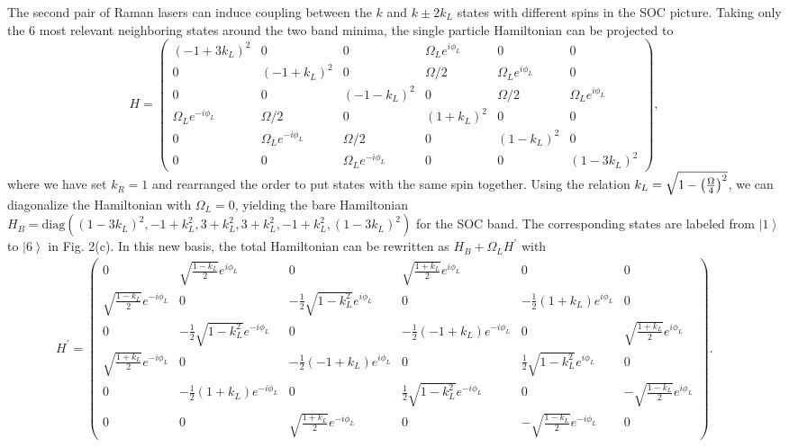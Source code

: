 \documentclass[twocolumn,prl,floatfix,citeautoscript,nofootinbib,superscriptaddress]{revtex4}
\begin{document}
The second pair of Raman lasers can induce coupling between the $k$ and $%
k\pm 2k_{L} $ states with different spins in the SOC picture. Taking only
the $6$ most relevant neighboring states around the two band minima, the
single particle Hamiltonian can be projected to
\begin{equation*}
H=\left(
\begin{array}{cccccc}
(-1+3k_{L})^{2} & 0 & 0 & \Omega _{L}e^{i\phi _{L}} & 0 & 0 \\
0 & (-1+k_{L})^{2} & 0 & \Omega /2 & \Omega _{L}e^{i\phi _{L}} & 0 \\
0 & 0 & (-1-k_{L})^{2} & 0 & \Omega /2 & \Omega _{L}e^{i\phi _{L}} \\
\Omega _{L}e^{-i\phi _{L}} & \Omega /2 & 0 & (1+k_{L})^{2} & 0 & 0 \\
0 & \Omega _{L}e^{-i\phi _{L}} & \Omega /2 & 0 & (1-k_{L})^{2} & 0 \\
0 & 0 & \Omega _{L}e^{-i\phi _{L}} & 0 & 0 & (1-3k_{L})^{2}%
\end{array}%
\right) ,
\end{equation*}%
where we have set $k_{R}=1$ and rearranged the order to put states with the
same spin together. Using the relation ${k_{L}}=\sqrt{1-{{\left( {\frac{%
\Omega }{4}}\right) }^{2}}}$, we can diagonalize the Hamiltonian with $%
\Omega _{L}=0$, yielding the bare Hamiltonian $H_{B}=\text{diag}\left(
(1-3k_{L})^{2},-1+k_{L}^{2},3+k_{L}^{2},3+k_{L}^{2},-1+k_{L}^{2},(1-3k_{L})^{2}\right)
$ for the SOC band. The corresponding states are labeled from $\left\vert
1\right\rangle $ to $\left\vert 6\right\rangle $ in Fig. 2(c). In this new
basis, the total Hamiltonian can be rewritten as $H_{B}+\Omega _{L}H^{\prime
}$ with
\begin{eqnarray*}
H^{\prime }= \left(
\begin{array}{cccccc}
0 & \sqrt{\frac{1-k_{L}}{2}}e^{i\phi _{L}} & 0 & \sqrt{\frac{1+k_{L}}{2}}%
e^{i\phi _{L}} & 0 & 0 \\
\sqrt{\frac{1-k_{L}}{2}}e^{-i\phi _{L}} & 0 & -\frac{1}{2}\sqrt{1-k_{L}^{2}}%
e^{i\phi _{L}} & 0 & -\frac{1}{2}(1+k_{L})e^{i\phi _{L}} & 0 \\
0 & -\frac{1}{2}\sqrt{1-k_{L}^{2}}e^{-i\phi _{L}} & 0 & -\frac{1}{2}%
(-1+k_{L})e^{-i\phi _{L}} & 0 & \sqrt{\frac{1+k_{L}}{2}}e^{i\phi _{L}} \\
\sqrt{\frac{1+k_{L}}{2}}e^{-i\phi _{L}} & 0 & -\frac{1}{2}(-1+k_{L})e^{i\phi
_{L}} & 0 & \frac{1}{2}\sqrt{1-k_{L}^{2}}e^{i\phi _{L}} & 0 \\
0 & -\frac{1}{2}(1+k_{L})e^{-i\phi _{L}} & 0 & \frac{1}{2}\sqrt{1-k_{L}^{2}}%
e^{-i\phi _{L}} & 0 & -\sqrt{\frac{1-k_{L}}{2}}e^{i\phi _{L}} \\
0 & 0 & \sqrt{\frac{1+k_{L}}{2}}e^{-i\phi _{L}} & 0 & -\sqrt{\frac{1-k_{L}}{2%
}}e^{-i\phi _{L}} & 0%
\end{array}%
\right). \\
&&
\end{eqnarray*}%
\end{document}
